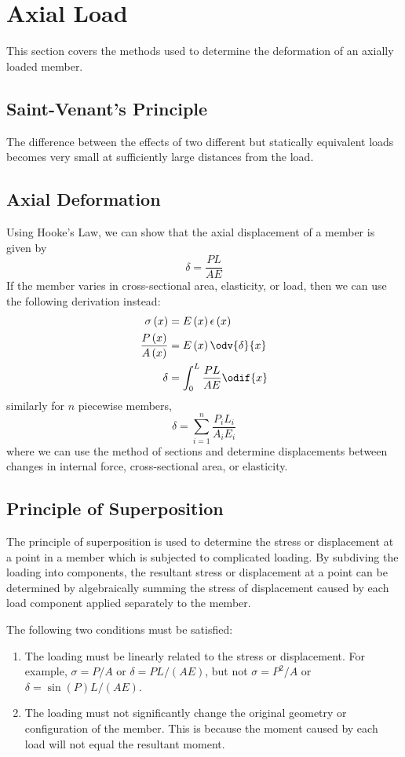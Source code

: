 \documentclass{article}
\begin{document}
\section{Axial Load}
This section covers the methods used to determine the deformation of an axially loaded member. 
\subsection{Saint-Venant's Principle}
The difference between the effects of two different but statically
equivalent loads becomes very small at sufficiently large distances from the load.
\subsection{Axial Deformation}
Using Hooke's Law, we can show that the axial displacement of a member is given by
\begin{equation*}
    \delta = \frac{P L}{A E}
\end{equation*}
If the member varies in cross-sectional area, elasticity, or load, then we can use the following derivation instead:
\begin{align*}
    \sigma\left( x \right) & = E\left( x \right) \epsilon\left( x \right) \\
    \frac{P\left( x \right)}{A\left( x \right)} & = E\left( x \right) \odv{\delta}{x} \\
    \delta & = \int_0^L \frac{P L}{A E} \odif{x}
\end{align*}
similarly for \(n\) piecewise members,
\begin{equation*}
    \delta = \sum_{i = 1}^n \frac{P_i L_i}{A_i E_i}
\end{equation*}
where we can use the method of sections and determine displacements 
between changes in internal force, cross-sectional area, or elasticity.
\subsection{Principle of Superposition}
The principle of superposition is used to determine the stress or displacement
at a point in a member which is subjected to complicated loading.
By subdiving the loading into components, the resultant stress or displacement at a point 
can be determined by algebraically summing the stress of displacement caused by each 
load component applied separately to the member.

The following two conditions must be satisfied:
\begin{enumerate}
    \item The loading must be linearly related to the stress or displacement. 
    For example, \(\sigma = P/A\) or \(\delta = PL/\left( AE \right)\), 
    but not \(\sigma = P^2/A\) or \(\delta = \sin{\left( P \right)}L/\left( AE \right)\).
    \item The loading must not significantly change the original geometry or 
    configuration of the member. This is because the moment
    caused by each load will not equal the resultant moment.
\end{enumerate}
\end{document}
